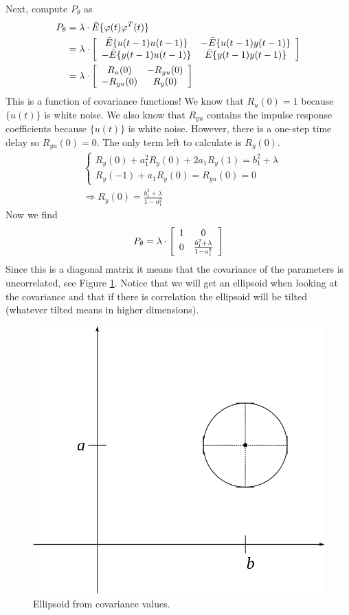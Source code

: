 \begin{example}
Next, compute $P_\theta$ as
\begin{align*}
P_\theta &= \lambda\cdot \bar{E}\{\varphi(t)\varphi^T(t)\} \\
&= \lambda\cdot \left[\begin{array}{c c}
\bar{E}\{u(t-1)u(t-1)\} & -\bar{E}\{u(t-1)y(t-1)\} \\
-\bar{E}\{y(t-1)u(t-1)\} & \bar{E}\{y(t-1)y(t-1)\}
\end{array}\right] \\
&= \lambda\cdot \left[\begin{array}{c c}
R_u(0) & -R_{yu}(0) \\ -R_{yu}(0) & R_y(0)
\end{array}\right]
\end{align*}
This is a function of covariance functions! We know that $R_u(0)=1$ because $\{u(t)\}$ is white noise. We also know that $R_{yu}$ contains the impulse response coefficients because $\{u(t)\}$ is white noise. However, there is a one-step time delay so $R_{yu}(0) = 0$. The only term left to calculate is $R_y(0)$.
\begin{align*}
&\begin{cases} R_y(0) + a_1^2R_y(0)+2a_1R_y(1) = b_1^2+\lambda \\ R_y(-1)+a_1R_y(0) = R_{yu}(0) = 0 \end{cases} \\
&\Rightarrow R_y(0) = \frac{b_1^2+\lambda}{1-a_1^2}
\end{align*}
Now we find
$$P_\theta = \lambda\cdot \left[\begin{array}{c c} 1 & 0 \\ 0 & \frac{b_1^2+\lambda}{1-a_1^2} \end{array}\right]$$
Since this is a diagonal matrix it means that the covariance of the parameters is uncorrelated, see Figure \ref{fig:15ellipsoid}. Notice that we will get an ellipsoid when looking at the covariance and that if there is correlation the ellipsoid will be tilted (whatever tilted means in higher dimensions).

\begin{figure}[ht!]
	\centering
	\includegraphics[width=.25\textwidth]{images/15ellipsoid}
	\caption{Ellipsoid from covariance values.}
	\label{fig:15ellipsoid}
\end{figure}


\end{example}
